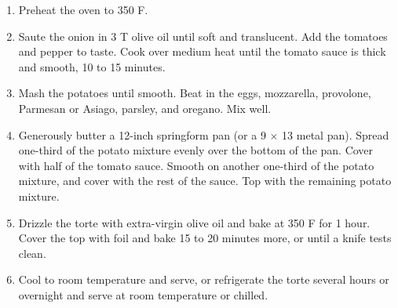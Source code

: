 
\begin{ingredients}
\end{ingredients}

\begin{recipe}

  \begin{enumerate}

  \item Preheat the oven to 350 F.
    
  \item Saute the onion in 3 T olive oil until soft and translucent.  Add the
    tomatoes and pepper to taste.  Cook over medium heat until the tomato
    sauce is thick and smooth, 10 to 15 minutes.
    
  \item Mash the potatoes until smooth.  Beat in the eggs, mozzarella,
    provolone, Parmesan or Asiago, parsley, and oregano.  Mix well.
    
  \item Generously butter a 12-inch springform pan (or a 9 $\times$ 13 metal pan).
    Spread one-third of the potato mixture evenly over the bottom of the
    pan.  Cover with half of the tomato sauce.  Smooth on another
    one-third of the potato mixture, and cover with the rest of the
    sauce.  Top with the remaining potato mixture.
    
  \item Drizzle the torte with extra-virgin olive oil and bake at 350 F for 1
    hour.  Cover the top with foil and bake 15 to 20 minutes more, or
    until a knife tests clean.
    
  \item Cool to room temperature and serve, or refrigerate the torte several
    hours or overnight and serve at room temperature or chilled.
  \end{enumerate}

\end{recipe}
